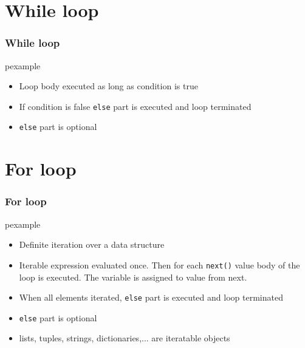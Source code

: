 \documentclass[trans,compress,xcolor=table]{beamer}
\begin{document}
\section{While loop}

\begin{frame}
\frametitle{While loop}
\begin{beamercolorbox}{pexample}
\codewhile
\end{beamercolorbox}
\begin{itemize}
\item Loop body executed as long as condition is true
\item If condition is false \lstinline!else! part is
 executed and loop terminated
 \item \lstinline!else! part is optional
\end{itemize}
\end{frame}
\section{For loop}

\begin{frame}
\frametitle{For loop}
\begin{beamercolorbox}{pexample}
\codefor
\end{beamercolorbox}
\begin{itemize}
\item Definite iteration over  a data structure
\item Iterable expression evaluated once. Then for each \lstinline!next()! value
     body of the loop is executed. The variable is assigned to value from next.
\item When all elements iterated, \lstinline!else! part is
 executed and loop terminated
 \item \lstinline!else! part is optional
 \item lists, tuples, strings, dictionaries,... are iteratable objects
\end{itemize}
\end{frame}
\end{document}
